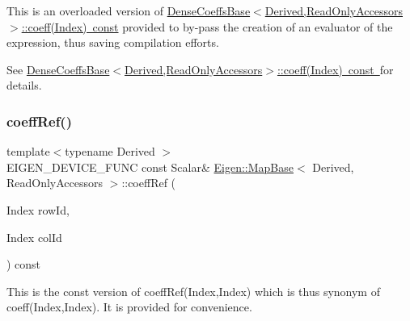 This is an overloaded version of \mbox{\hyperlink{class_eigen_1_1_dense_coeffs_base_3_01_derived_00_01_read_only_accessors_01_4_ad52344ad1f42852db71996590d2de0de}{Dense\+Coeffs\+Base$<$\+Derived,\+Read\+Only\+Accessors$>$\+::coeff(\+Index) const}} provided to by-\/pass the creation of an evaluator of the expression, thus saving compilation efforts.

See \mbox{\hyperlink{class_eigen_1_1_dense_coeffs_base_3_01_derived_00_01_read_only_accessors_01_4_ad52344ad1f42852db71996590d2de0de}{Dense\+Coeffs\+Base$<$\+Derived,\+Read\+Only\+Accessors$>$\+::coeff(\+Index) const }}for details. \mbox{\label{class_eigen_1_1_map_base_3_01_derived_00_01_read_only_accessors_01_4_ad4e9a2bf0255f870a45ce88e30815b59}} 
\subsubsection{\texorpdfstring{coeffRef()}{coeffRef()}\hspace{0.1cm}{\footnotesize\ttfamily [1/2]}}
{\footnotesize\ttfamily template$<$typename Derived $>$ \\
E\+I\+G\+E\+N\+\_\+\+D\+E\+V\+I\+C\+E\+\_\+\+F\+U\+NC const Scalar\& \mbox{\hyperlink{class_eigen_1_1_map_base}{Eigen\+::\+Map\+Base}}$<$ Derived, Read\+Only\+Accessors $>$\+::coeff\+Ref (\begin{DoxyParamCaption}\item[{Index}]{row\+Id,  }\item[{Index}]{col\+Id }\end{DoxyParamCaption}) const\hspace{0.3cm}{\ttfamily [inline]}}





This is the const version of coeff\+Ref(\+Index,\+Index) which is thus synonym of coeff(\+Index,\+Index). It is provided for convenience. \mbox{\label{class_eigen_1_1_map_base_3_01_derived_00_01_read_only_accessors_01_4_abae7b3615ed05ef13cd06065fe71c98e}} 
